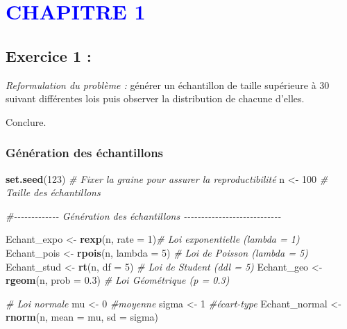 \documentclass[
  12pt,
]{article}
\author{}
\date{\vspace{-2.5em}}
\newenvironment{Shaded}{\begin{snugshade}}{\end{snugshade}}
\newcommand{\AttributeTok}[1]{\textcolor[rgb]{0.13,0.29,0.53}{#1}}
\newcommand{\CommentTok}[1]{\textcolor[rgb]{0.56,0.35,0.01}{\textit{#1}}}
\newcommand{\DecValTok}[1]{\textcolor[rgb]{0.00,0.00,0.81}{#1}}
\newcommand{\FloatTok}[1]{\textcolor[rgb]{0.00,0.00,0.81}{#1}}
\newcommand{\FunctionTok}[1]{\textcolor[rgb]{0.13,0.29,0.53}{\textbf{#1}}}
\newcommand{\NormalTok}[1]{#1}
\newcommand{\OtherTok}[1]{\textcolor[rgb]{0.56,0.35,0.01}{#1}}
\begin{document}


\newpage

\renewcommand{\contentsname}{\centering\textcolor{blue}{CONTENTS}}

\tableofcontents

\newpage

\section{\texorpdfstring{\textcolor{blue}{CHAPITRE 1}}{}}\label{section}

\subsection{Exercice 1 :}\label{exercice-1}

\emph{Reformulation du problème :} générer un échantillon de taille
supérieure à 30 suivant différentes lois puis observer la distribution
de chacune d'elles.

Conclure.

\subsubsection{Génération des
échantillons}\label{guxe9nuxe9ration-des-uxe9chantillons}

\begin{Shaded}
\begin{Highlighting}[]
\FunctionTok{set.seed}\NormalTok{(}\DecValTok{123}\NormalTok{) }\CommentTok{\# Fixer la graine pour assurer la reproductibilité}
\NormalTok{n }\OtherTok{\textless{}{-}} \DecValTok{100} \CommentTok{\# Taille des échantillons }

\CommentTok{\#{-}{-}{-}{-}{-}{-}{-}{-}{-}{-}{-}{-}{-} Génération des échantillons {-}{-}{-}{-}{-}{-}{-}{-}{-}{-}{-}{-}{-}{-}{-}{-}{-}{-}{-}{-}{-}{-}{-}{-}{-}{-}{-}{-}}

\NormalTok{Echant\_expo }\OtherTok{\textless{}{-}} \FunctionTok{rexp}\NormalTok{(n, }\AttributeTok{rate =} \DecValTok{1}\NormalTok{)}\CommentTok{\# Loi exponentielle (lambda = 1)}
\NormalTok{Echant\_pois }\OtherTok{\textless{}{-}} \FunctionTok{rpois}\NormalTok{(n, }\AttributeTok{lambda =} \DecValTok{5}\NormalTok{) }\CommentTok{\# Loi de Poisson (lambda = 5)}
\NormalTok{Echant\_stud }\OtherTok{\textless{}{-}} \FunctionTok{rt}\NormalTok{(n, }\AttributeTok{df =} \DecValTok{5}\NormalTok{) }\CommentTok{\# Loi de Student (ddl = 5)}
\NormalTok{Echant\_geo }\OtherTok{\textless{}{-}} \FunctionTok{rgeom}\NormalTok{(n, }\AttributeTok{prob =} \FloatTok{0.3}\NormalTok{) }\CommentTok{\# Loi Géométrique (p = 0.3)}

\CommentTok{\# Loi normale}
\NormalTok{mu }\OtherTok{\textless{}{-}} \DecValTok{0}  \CommentTok{\#moyenne   }
\NormalTok{sigma }\OtherTok{\textless{}{-}} \DecValTok{1}  \CommentTok{\#écart{-}type}
\NormalTok{Echant\_normal }\OtherTok{\textless{}{-}} \FunctionTok{rnorm}\NormalTok{(n, }\AttributeTok{mean =}\NormalTok{ mu, }\AttributeTok{sd =}\NormalTok{ sigma)}
\end{Highlighting}
\end{Shaded}
\end{document}
